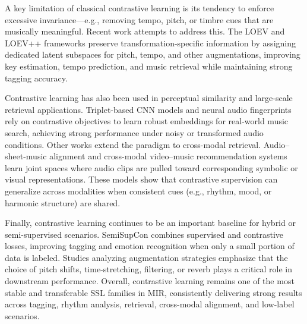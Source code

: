 \documentclass[12pt]{report}
\begin{document}
A key limitation of classical contrastive learning is its tendency to enforce excessive invariance—e.g., removing tempo, pitch, or timbre cues that are musically meaningful. Recent work attempts to address this. The LOEV and LOEV++ frameworks \cite{guinot_leave-one-equivariant_2025} preserve transformation-specific information by assigning dedicated latent subspaces for pitch, tempo, and other augmentations, improving key estimation, tempo prediction, and music retrieval while maintaining strong tagging accuracy.

Contrastive learning has also been used in perceptual similarity and large-scale retrieval applications. Triplet-based CNN models \cite{thome_musical_2022} and neural audio fingerprints \cite{chang_neural_2021} rely on contrastive objectives to learn robust embeddings for real-world music search, achieving strong performance under noisy or transformed audio conditions. Other works extend the paradigm to cross-modal retrieval. Audio–sheet-music alignment \cite{carvalho_self-supervised_2023} and cross-modal video–music recommendation systems \cite{teng_mvbind_2024,stewart_semi-supervised_2025,pretet_cross-modal_2021} learn joint spaces where audio clips are pulled toward corresponding symbolic or visual representations. These models show that contrastive supervision can generalize across modalities when consistent cues (e.g., rhythm, mood, or harmonic structure) are shared.

Finally, contrastive learning continues to be an important baseline for hybrid or semi-supervised scenarios. SemiSupCon \cite{guinot_semi-supervised_2024} combines supervised and contrastive losses, improving tagging and emotion recognition when only a small portion of data is labeled. Studies analyzing augmentation strategies \cite{choi_towards_2022} emphasize that the choice of pitch shifts, time-stretching, filtering, or reverb plays a critical role in downstream performance. Overall, contrastive learning remains one of the most stable and transferable SSL families in MIR, consistently delivering strong results across tagging, rhythm analysis, retrieval, cross-modal alignment, and low-label scenarios.
\end{document}

